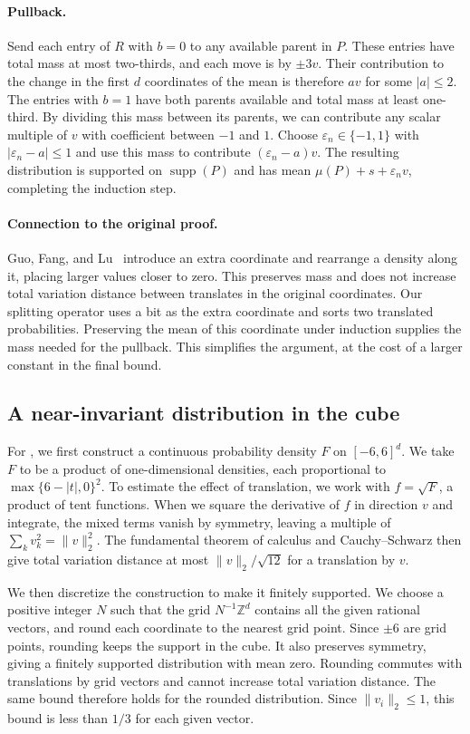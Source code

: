 \documentclass{article}
\newcommand{\eps}{\varepsilon}
\newcommand{\supp}{\operatorname{supp}}
\begin{document}
\paragraph{Pullback.}
Send each entry of $R$ with $b=0$ to any available parent in $P$.
These entries have total mass at most two-thirds, and each move
is by $\pm3v$. Their contribution to the change in the first $d$
coordinates of the mean is therefore $av$ for some $|a|\le2$.
The entries with $b=1$ have both parents available and total mass
at least one-third. By dividing this mass between its parents,
we can contribute any scalar multiple of $v$ with coefficient
between $-1$ and $1$.
Choose $\eps_n\in\{-1,1\}$ with $|\eps_n-a|\le1$ and use
this mass to contribute $(\eps_n-a)v$. The resulting distribution
is supported on $\supp(P)$ and has mean
$\mu(P)+s+\eps_n v$, completing the induction step.

\paragraph{Connection to the original proof.}
Guo, Fang, and Lu~\cite[Section~4]{guo2026vector} introduce an
extra coordinate and rearrange a density along it, placing larger
values closer to zero. This preserves mass and does not increase
total variation distance between translates in the original
coordinates. Our splitting operator uses a bit as the extra
coordinate and sorts two translated probabilities. Preserving
the mean of this coordinate under induction supplies the mass
needed for the pullback. This simplifies the argument, at the
cost of a larger constant in the final bound.

\subsection{A near-invariant distribution in the cube}

For , we first construct a continuous probability
density $F$ on $[-6,6]^d$. We take $F$ to be a product of
one-dimensional densities, each proportional to $\max\{6-|t|,0\}^2$.
To estimate the effect of translation, we work with $f=\sqrt{F}$,
a product of tent functions. When we square the derivative of $f$
in direction $v$ and integrate, the mixed terms vanish by symmetry,
leaving a multiple of $\sum_k v_k^2=\|v\|_2^2$. The fundamental
theorem of calculus and Cauchy--Schwarz then give total variation
distance at most $\|v\|_2/\sqrt{12}$ for a translation by $v$.

We then discretize the construction to make it finitely supported. We choose a positive integer $N$ such that the grid
$N^{-1}\mathbb{Z}^d$ contains all the given rational vectors, and
round each coordinate to the nearest grid point. Since $\pm6$
are grid points, rounding keeps the support in the cube. It also
preserves symmetry, giving a finitely supported distribution with
mean zero. Rounding commutes with translations by grid vectors
and cannot increase total variation
distance. The same bound therefore holds for the rounded
distribution. Since $\|v_i\|_2\le1$, this bound is less than
$1/3$ for each given vector.
\end{document}
